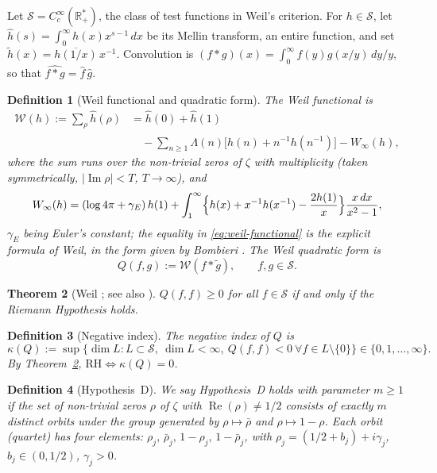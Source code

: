 \documentclass[11pt]{amsart}
\newtheorem{theorem}{Theorem}[section]
\newtheorem{definition}[theorem]{Definition}
\renewcommand{\Re}{\operatorname{Re}}
\renewcommand{\Im}{\operatorname{Im}}
\newcommand{\kap}{\kappa}
\newcommand{\Scal}{\mathcal{S}}
\newcommand{\Wcal}{\mathcal{W}}
\newcommand{\Rp}{\mathbb{R}^*_+}
\begin{document}
Let $\Scal = C_c^\infty(\Rp)$, the class of test functions in Weil's criterion.  For
$h \in \Scal$, let $\hat h(s) = \int_0^\infty h(x)x^{s-1}\,dx$ be its Mellin transform, an
entire function, and set $\tilde h(x) = \overline{h(1/x)}\, x^{-1}$.  Convolution is
$(f*g)(x)=\int_0^\infty f(y)g(x/y)\,dy/y$, so that $\widehat{f*g}=\hat f\,\hat g$.

\begin{definition}[Weil functional and quadratic form]\label{def:weil}
The \emph{Weil functional} is
\begin{equation}\label{eq:weil-functional}
\begin{split}
  \Wcal(h) := \sum_\rho \hat h(\rho)
  &= \hat h(0)+\hat h(1)\\
  &\quad-\sum_{n\ge1}\Lambda(n)\bigl[h(n)+n^{-1}h(n^{-1})\bigr]-W_\infty(h),
\end{split}
\end{equation}
where the sum runs over the non-trivial zeros of $\zeta$ with multiplicity (taken
symmetrically, $|\Im\rho|<T$, $T\to\infty$), and
\[
  W_\infty(h)=(\log 4\pi+\gamma_E)\,h(1)
  +\int_1^\infty\Bigl\{h(x)+x^{-1}h(x^{-1})-\frac{2h(1)}{x}\Bigr\}\frac{x\,dx}{x^2-1},
\]
$\gamma_E$ being Euler's constant; the equality in \eqref{eq:weil-functional} is the explicit
formula of Weil, in the form given by Bombieri \cite{Bombieri00}.
The \emph{Weil quadratic form} is
\[
  Q(f,g) := \Wcal(f * \tilde g), \qquad f, g \in \Scal.
\]
\end{definition}

\begin{theorem}[Weil \cite{Weil52}; see also \cite{Bombieri00}]\label{thm:weil-positivity}
$Q(f,f) \ge 0$ for all $f \in \Scal$ if and only if the Riemann Hypothesis holds.
\end{theorem}

\begin{definition}[Negative index]\label{def:krein-index}
The \emph{negative index} of $Q$ is
\[
  \kap(Q) := \sup\bigl\{\dim L : L\subset\Scal,\ \dim L<\infty,\
  Q(f,f)<0 \ \forall f\in L\setminus\{0\}\bigr\}\in\{0,1,\dots,\infty\}.
\]
By Theorem~\ref{thm:weil-positivity}, $\mathrm{RH} \iff \kap(Q) = 0$.
\end{definition}

\begin{definition}[Hypothesis~D]\label{def:hypD}
We say \emph{Hypothesis~D holds with parameter} $m \ge 1$ if the set of non-trivial zeros
$\rho$ of $\zeta$ with $\Re(\rho) \ne 1/2$ consists of exactly $m$ distinct orbits under
the group generated by $\rho\mapsto\bar\rho$ and $\rho\mapsto1-\rho$.
Each orbit (quartet) has four elements: $\rho_j,\,\bar\rho_j,\,1-\rho_j,\,1-\bar\rho_j$, with
$\rho_j = (1/2+b_j)+i\gamma_j$, $b_j \in (0,1/2)$, $\gamma_j > 0$.
\end{definition}
\end{document}
